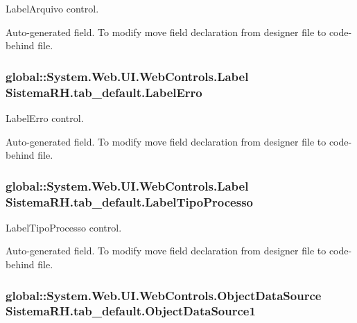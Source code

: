 LabelArquivo control. 

Auto-\/generated field. To modify move field declaration from designer file to code-\/behind file. \hypertarget{class_sistema_r_h_1_1tab__default_a63a27ef346cfd16fe3437aa19926f88c}{
\subsubsection[{LabelErro}]{\setlength{\rightskip}{0pt plus 5cm}global::System.Web.UI.WebControls.Label {\bf SistemaRH.tab\_\-default.LabelErro}}}
\label{class_sistema_r_h_1_1tab__default_a63a27ef346cfd16fe3437aa19926f88c}


LabelErro control. 

Auto-\/generated field. To modify move field declaration from designer file to code-\/behind file. \hypertarget{class_sistema_r_h_1_1tab__default_a7f6a793b6c42067e9b0ca36c49ee889f}{
\subsubsection[{LabelTipoProcesso}]{\setlength{\rightskip}{0pt plus 5cm}global::System.Web.UI.WebControls.Label {\bf SistemaRH.tab\_\-default.LabelTipoProcesso}}}
\label{class_sistema_r_h_1_1tab__default_a7f6a793b6c42067e9b0ca36c49ee889f}


LabelTipoProcesso control. 

Auto-\/generated field. To modify move field declaration from designer file to code-\/behind file. \hypertarget{class_sistema_r_h_1_1tab__default_a0cd653428e8c98d939aff2d11ff144dd}{
\subsubsection[{ObjectDataSource1}]{\setlength{\rightskip}{0pt plus 5cm}global::System.Web.UI.WebControls.ObjectDataSource {\bf SistemaRH.tab\_\-default.ObjectDataSource1}}}
\label{class_sistema_r_h_1_1tab__default_a0cd653428e8c98d939aff2d11ff144dd}


